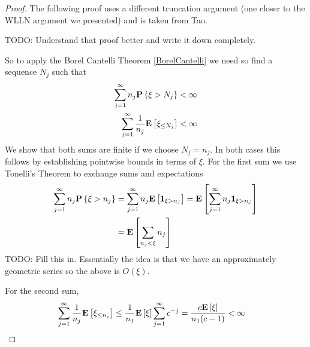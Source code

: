 \begin{proof}The following proof uses a different truncation argument
  (one closer to the WLLN argument we presented) and is
  taken from Tao.

TODO:  Understand that proof better and write it down completely.

So to apply the Borel Cantelli Theorem \ref{BorelCantelli} we need so find a sequence $N_j$ such that 
\begin{align*}
\sum_{j=1}^\infty n_j \textbf{P}\left \{\xi > N_j \right \} &< \infty \\
\sum_{j=1}^\infty \frac{1}{n_j} \textbf{E}\left[\xi_{\leq N_j}\right] &< \infty 
\end{align*}
We show that both sums are finite if we choose $N_j = n_j$.  In both
cases this follows by establishing pointwise bounds in terms of
$\xi$.  For the first sum we use Tonelli's Theorem to exchange sums
and expectations
\begin{align*}
\sum_{j=1}^\infty n_j \textbf{P}\left \{\xi > n_j \right \} &= \sum_{j=1}^\infty n_j
\textbf{E}\left[\textbf{1}_{\xi > n_j}\right]= 
\textbf{E}\left[\sum_{j=1}^\infty n_j\textbf{1}_{\xi > n_j}\right] \\
&=\textbf{E}\left[\sum_{n_j < \xi}  n_j\right] 
\end{align*}
TODO: Fill this in.  Essentially the idea is that we have an
approximately geometric series so the above is $O(\xi)$.

For the second sum, 
\begin{align*}
\sum_{j=1}^\infty \frac{1}{n_j} \textbf{E}\left[\xi_{\leq n_j}\right] &\leq
\frac{1}{n_1} \textbf{E}\left[\xi\right] \sum_{j=1}^\infty c^{-j} =
\frac{c  \textbf{E}\left[\xi\right]}{n_1(c-1)} < \infty
\end{align*}
\end{proof}

